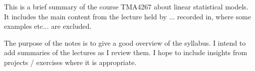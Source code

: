 
This is a brief summary of the course TMA4267 about linear statistical models. It includes the main content from the lecture held by ... recorded in, where some examples etc... are excluded. 

The purpose of the notes is to give a good overview of the syllabus. I intend to add summaries of the lectures as I review them. I hope to include insights from projects / exercises where it is appropriate. 

